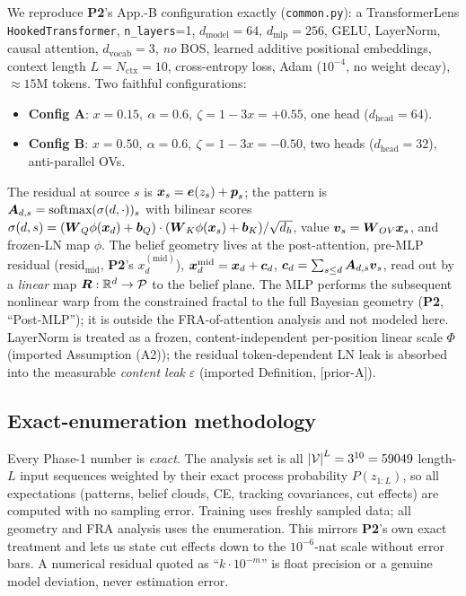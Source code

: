 \documentclass{article}
\newcommand{\Wq}{\boldsymbol{W}_Q}
\newcommand{\Wk}{\boldsymbol{W}_K}
\newcommand{\Pcal}{\mathcal{P}}
\newcommand{\resmid}{\mathrm{resid}_{\mathrm{mid}}}
\newcommand{\Ptwo}{\textbf{P2}}
\newcommand{\priorA}{\textsf{[prior-A]}}
\begin{document}
We reproduce \Ptwo's App.-B configuration exactly (\texttt{common.py}): a
TransformerLens \texttt{HookedTransformer}, \texttt{n\_layers}=1,
$d_{\mathrm{model}}=64$, $d_{\mathrm{mlp}}=256$, GELU, LayerNorm, causal attention,
$d_{\mathrm{vocab}}=3$, \emph{no} BOS, learned additive positional embeddings,
context length $L=N_{\mathrm{ctx}}=10$, cross-entropy loss, Adam ($10^{-4}$, no
weight decay), ${\approx}15$M tokens. Two faithful configurations:
\begin{itemize}
\item \textbf{Config A}: $x=0.15,\ \alpha=0.6,\ \zeta=1-3x=+0.55$, one head
($d_{\mathrm{head}}=64$).
\item \textbf{Config B}: $x=0.50,\ \alpha=0.6,\ \zeta=1-3x=-0.50$, two heads
($d_{\mathrm{head}}=32$), anti-parallel OVs.
\end{itemize}
The residual at source $s$ is $\boldsymbol{x}_s=\boldsymbol{e}(z_s)+\boldsymbol{p}_s$; the pattern is
$\boldsymbol{A}_{d,s}=\textrm{softmax}(\sigma(d,\cdot))_s$ with bilinear scores
$\sigma(d,s)=(\Wq\phi(\xb_d)+\boldsymbol b_Q)\cdot(\Wk\phi(\xb_s)+\boldsymbol b_K)/\sqrt{d_h}$,
value $\boldsymbol{v}_s=\boldsymbol{W}_{OV}\boldsymbol{x}_s$, and frozen-LN map $\phi$. The belief geometry lives at the
post-attention, pre-MLP residual ($\resmid$, \Ptwo's $x_d^{(\mathrm{mid})}$),
$\boldsymbol{x}_d^{\mathrm{mid}}=\boldsymbol{x}_d+\boldsymbol{c}_d$, $\boldsymbol{c}_d=\sum_{s\le d}\boldsymbol{A}_{d,s}\boldsymbol{v}_s$, read out by
a \emph{linear} map $\Rb:\mathbb{R}^{d}\to\Pcal$ to the belief plane. The MLP
performs the subsequent nonlinear warp from the constrained fractal to the full
Bayesian geometry (\Ptwo, ``Post-MLP''); it is outside the FRA-of-attention
analysis and not modeled here. LayerNorm is treated as a frozen,
content-independent per-position linear scale $\Phi$ (imported Assumption (A2)); the
residual token-dependent LN leak is absorbed into the measurable \emph{content
leak} $\varepsilon$ (imported Definition, \priorA).

\subsection{Exact-enumeration methodology}\label{sec:enum}

\begin{remark}\label{rem:exact}
Every Phase-1 number is \emph{exact}. The analysis set is all
${\vert \mathcal{V}\vert}^{L}=3^{10}=59049$ length-$L$ input sequences weighted by their exact
process probability $P(z_{1:L})$, so all expectations (patterns, belief clouds, CE,
tracking covariances, cut effects) are computed with no sampling error. Training
uses freshly sampled data; all geometry and FRA analysis uses the enumeration. This
mirrors \Ptwo's own exact treatment and lets us state cut effects down to the
$10^{-6}$-nat scale without error bars. A numerical residual quoted as
``$k\cdot10^{-m}$'' is float precision or a genuine model deviation, never
estimation error.
\end{remark}
\end{document}
